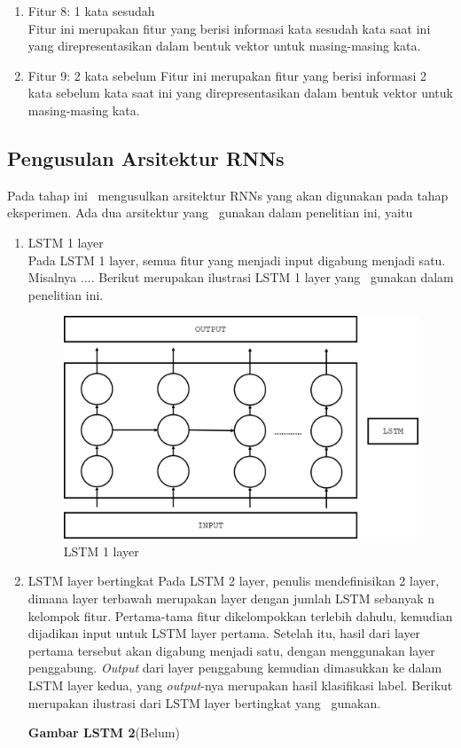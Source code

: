 \begin{enumerate}
 \item Fitur 8: 1 kata sesudah\\
 Fitur ini merupakan fitur yang berisi informasi kata sesudah kata saat ini yang direpresentasikan dalam bentuk vektor untuk masing-masing kata.
 
 \item Fitur 9: 2 kata sebelum
 Fitur ini merupakan fitur yang berisi informasi 2 kata sebelum kata saat ini yang direpresentasikan dalam bentuk vektor untuk masing-masing kata.
 
\end{enumerate}

\subsection{Pengusulan Arsitektur RNNs}
Pada tahap ini \saya~mengusulkan arsitektur RNNs yang akan digunakan pada tahap eksperimen. Ada dua arsitektur yang \saya~gunakan dalam penelitian ini, yaitu
\begin{enumerate}
	\item LSTM 1 layer\\
	Pada LSTM 1 layer, semua fitur yang menjadi input digabung menjadi satu. Misalnya .... Berikut merupakan ilustrasi LSTM 1 layer yang \saya~gunakan dalam penelitian ini.
	
	\begin{figure}
		\centering
		\includegraphics[width=0.8\linewidth]{images/single_layer_rnn}
		\caption{LSTM 1 layer}
		\label{fig:single_layer_rnn}
	\end{figure}

	\item LSTM layer bertingkat
	Pada LSTM 2 layer, penulis mendefinisikan 2 layer, dimana layer terbawah merupakan layer dengan jumlah LSTM sebanyak n kelompok fitur. Pertama-tama fitur dikelompokkan terlebih dahulu, kemudian dijadikan input untuk LSTM layer pertama. Setelah itu, hasil dari layer pertama tersebut akan digabung menjadi satu, dengan menggunakan layer penggabung. \textit{Output} dari layer penggabung kemudian dimasukkan ke dalam LSTM layer kedua, yang \textit{output}-nya merupakan hasil klasifikasi label. Berikut merupakan ilustrasi dari LSTM layer bertingkat yang \saya~gunakan.
	
	\textbf{Gambar LSTM 2}(Belum)
	
\end{enumerate}
	
